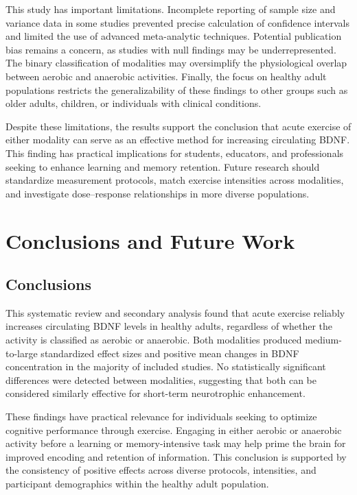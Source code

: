 \documentclass[runningheads]{llncs}
\begin{document}
This study has important limitations. Incomplete reporting of sample size and variance data in some studies prevented precise calculation of confidence intervals and limited the use of advanced meta-analytic techniques. Potential publication bias remains a concern, as studies with null findings may be underrepresented. The binary classification of modalities may oversimplify the physiological overlap between aerobic and anaerobic activities. Finally, the focus on healthy adult populations restricts the generalizability of these findings to other groups such as older adults, children, or individuals with clinical conditions.

Despite these limitations, the results support the conclusion that acute exercise of either modality can serve as an effective method for increasing circulating BDNF. This finding has practical implications for students, educators, and professionals seeking to enhance learning and memory retention. Future research should standardize measurement protocols, match exercise intensities across modalities, and investigate dose–response relationships in more diverse populations.

\section{Conclusions and Future Work}

\subsection{Conclusions}

This systematic review and secondary analysis found that acute exercise reliably increases circulating BDNF levels in healthy adults, regardless of whether the activity is classified as aerobic or anaerobic. Both modalities produced medium-to-large standardized effect sizes and positive mean changes in BDNF concentration in the majority of included studies. No statistically significant differences were detected between modalities, suggesting that both can be considered similarly effective for short-term neurotrophic enhancement.

These findings have practical relevance for individuals seeking to optimize cognitive performance through exercise. Engaging in either aerobic or anaerobic activity before a learning or memory-intensive task may help prime the brain for improved encoding and retention of information. This conclusion is supported by the consistency of positive effects across diverse protocols, intensities, and participant demographics within the healthy adult population.
\end{document}
